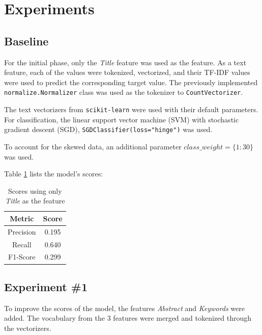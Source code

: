 \documentclass[11pt]{article}
\begin{document}
\section*{Experiments}

\subsection*{Baseline}
For the initial phase, only the \textit{Title} feature was used as the feature. As a text feature, each of the values were tokenized, vectorized, and their TF-IDF values were used to predict the corresponding target value. The previously implemented \texttt{normalize.Normalizer} class was used as the tokenizer to \texttt{CountVectorizer}.

The text vectorizers from \texttt{scikit-learn} were used with their default parameters. For classification, the linear support vector machine (SVM) with stochastic gradient descent (SGD), \texttt{SGDClassifier(loss="hinge")} was used.

To account for the skewed data, an additional parameter $class\_weight=\{1:30\}$ was used.

Table \ref{table:base_score} lists the model's scores:
\begin{table}[!ht]
    \caption{Scores using only \textit{Title} as the feature}
    \label{table:base_score}
    \begin{center}

        \begin{tabular}{| c | c |}
        \hline
        \textbf{Metric} & \textbf{Score}
        \\ \hline
        Precision & 0.195 
        \\ \hline
        Recall & 0.640
        \\ \hline
        F1-Score & 0.299
        \\ \hline
        \end{tabular}

    \end{center}

\end{table}

\subsection*{Experiment \#1}
To improve the scores of the model, the features \textit{Abstract} and \textit{Keywords} were added. The vocabulary from the 3 features were merged and tokenized through the vectorizers. 
\end{document}
